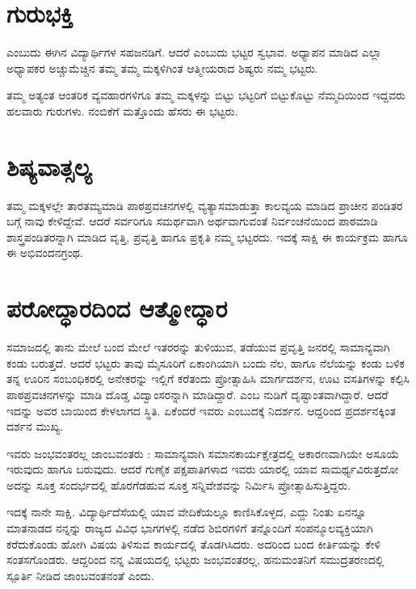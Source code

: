 {\section*{ಗುರುಭಕ್ತಿ}  
\vskip -4pt

   ಎಂಬುದು ಈಗಿನ ವಿದ್ಯಾರ್ಥಿಗಳ ಸಹಜನಡಿಗೆ.  ಆದರೆ   ಎಂಬುದು ಭಟ್ಟರ ಸ್ವಭಾವ.  ಅಧ್ಯಾಪನ ಮಾಡಿದ ಎಲ್ಲಾ ಅಧ್ಯಾಪಕರ ಅಚ್ಚುಮೆಚ್ಚಿನ ತಮ್ಮ ತಮ್ಮ ಮಕ್ಕಳಿಗಿಂತ ಆತ್ಮೀಯರಾದ ಶಿಷ್ಯರು ನಮ್ಮ ಭಟ್ಟರು.

ತಮ್ಮ ಅತ್ಯಂತ ಆಂತರಿಕ ವ್ಯವಹಾರಗಳಿಗೂ ತಮ್ಮ ಮಕ್ಕಳನ್ನು ಬಿಟ್ಟು ಭಟ್ಟರಿಗೆ ಬಿಟ್ಟುಕೊಟ್ಟು ನೆಮ್ಮದಿಯಿಂದ ಇದ್ದವರು ಹಲವಾರು ಗುರುಗಳು. ನಂಬಿಕೆಗೆ ಮತ್ತೊಂದು ಹೆಸರು ಈ ಭಟ್ಟರು.
\vskip -10pt

\section*{ಶಿಷ್ಯವಾತ್ಸಲ್ಯ} 
\vskip -2pt

ತಮ್ಮ ಮಕ್ಕಳಲ್ಲೇ ತಾರತಮ್ಯಮಾಡಿ ಪಾಠಪ್ರವಚನಗಳಲ್ಲಿ ವ್ಯತ್ಯಾಸಮಾಡುತ್ತಾ ಕಾಲವ್ಯಯ ಮಾಡಿದ ಪ್ರಾಚೀನ ಪಂಡಿತರ ಬಗ್ಗೆ ನಾವು ಕೇಳಿದ್ದೇವೆ.  ಆದರೆ ಸರ್ವರಿಗೂ ಸಮರ್ಥ\-ವಾಗಿ ಅರ್ಥವಾಗುವಂತೆ ನಿರ್ವಂಚನೆಯಿಂದ ಪಾಠಮಾಡಿ ಶಾಸ್ತ್ರಪಂಡಿತ\-ರನ್ನಾಗಿ ಮಾಡಿದ ವೃತ್ತಿ, ಪ್ರವೃತ್ತಿ ಹಾಗೂ ಪ್ರಕೃತಿ ನಮ್ಮ ಭಟ್ಟರದು.  ಇದಕ್ಕೆ ಸಾಕ್ಷಿ ಈ ಕಾರ್ಯಕ್ರಮ ಹಾಗೂ ಈ ಅಭಿವಂದನಗ್ರಂಥ.
\vskip -10pt

\section*{ಪರೋದ್ಧಾರದಿಂದ ಆತ್ಮೋದ್ಧಾರ} 
\vskip -2pt

ಸಮಾಜದಲ್ಲಿ ತಾನು ಮೇಲೆ ಬಂದ ಮೇಲೆ ಇತರರನ್ನು ತುಳಿಯುವ, ತಡೆಯುವ ಪ್ರವೃತ್ತಿ ಜನರಲ್ಲಿ ಸಾಮಾನ್ಯವಾಗಿ ಕಂಡು ಬರುತ್ತದೆ.  ಆದರೆ ಭಟ್ಟರು ತಾವು ಮೈಸೂರಿಗೆ ಏಕಾಂಗಿಯಾಗಿ ಬಂದು ನೆಲ, ಹಾಗೂ ನೆಲೆಯನ್ನು ಕಂಡು ಬಳಿಕ ತನ್ನ ಊರಿನ  ಸಂಬಂಧಿಕರಲ್ಲಿ ಅನೇಕರನ್ನು ಇಲ್ಲಿಗೆ ಕರೆತಂದು ಪ್ರೋತ್ಸಾಹಿಸಿ ಮಾರ್ಗದರ್ಶನ, ಊಟ ವಸತಿ\-ಗಳನ್ನು ಕಲ್ಪಿಸಿ ಪಾಠಪ್ರವಚನಗಳನ್ನು ಮಾಡಿ ದೊಡ್ಡ ವಿದ್ವಾಂಸರನ್ನಾಗಿ ಮಾಡಿದ್ದಾರೆ.\break {} ಎಂಬ ನುಡಿಗೆ ದೃಷ್ಟಾಂತವಾಗಿದ್ದಾರೆ.  ಆದರೆ ಇದನ್ನು ಅವರ ಬಾಯಿಂದ ಕೇಳಲಾಗದ ಸ್ಥಿತಿ.  ಏಕೆಂದರೆ ಇವರು   ಎಂಬುದಕ್ಕೆ ನಿದರ್ಶನ. ಆದ್ದರಿಂದ ಪ್ರದರ್ಶನಕ್ಕಿಂತ ದರ್ಶನ ಮುಖ್ಯ. 

ಇವರು ಜಂಭವಂತರಲ್ಲ ಜಾಂಬವಂತರು :  \enginline{-}    ಸಾಮಾನ್ಯವಾಗಿ ಸಮಾನಕಾರ್ಯಕ್ಷೇತ್ರದಲ್ಲಿ ಅಕಾರಣವಾಗಿಯೇ ಅಸೂಯೆ ಇರುವುದು ಹಾಗೂ ಬರುವುದು.  ಆದರೆ ಗುಣೈಕ ಪಕ್ಷಪಾತಿಗಳಾದ ಇವರು ಯಾರಲ್ಲಿ ಯಾವ ಸಾಮರ್ಥ್ಯವಿರುತ್ತದೋ ಅದನ್ನು ಸೂಕ್ತ ಸಂದರ್ಭದಲ್ಲಿ ಹೊರಗೆಡಹುವ  ಸೂಕ್ತ ಸನ್ನಿವೇಶವನ್ನು ನಿರ್ಮಿಸಿ ಪ್ರೋತ್ಸಾಹಿಸು\-ತ್ತಿದ್ದರು. 

ಇದಕ್ಕೆ ನಾನೇ ಸಾಕ್ಷಿ.  ವಿದ್ಯಾರ್ಥಿದೆಸೆಯಲ್ಲಿ ಯಾವ ವೇದಿಕೆಯಲ್ಲೂ ಕಾಣಿಸಿಕೊಳ್ಳದ, ಎದ್ದು ನಿಂತು ಏನನ್ನೂ ಮಾತನಾಡದ ನನ್ನನ್ನು ರಾಜ್ಯದ ವಿವಿಧ ಭಾಗಗಳಲ್ಲಿ ನಡೆದ ಶಿಬಿರ\-ಗಳಿಗೆ ತನ್ನೊಂದಿಗೆ ಸಂಪನ್ಮೂಲವ್ಯಕ್ತಿಯಾಗಿ ಕರೆದುಕೊಂಡು ಹೋಗಿ ವಿಷಯ ತಿಳಿಸುವ ಕಾರ್ಯದಲ್ಲಿ ತೊಡಗಿಸಿದರು.  ಅದರಿಂದ ಬಂದ ಕೀರ್ತಿಯನ್ನು ಕೇಳಿ ಸಂತಸಗೊಂಡರು.  ಆದ್ದರಿಂದ ನನ್ನ ವಿಷಯದಲ್ಲಿ ಭಟ್ಟರು ಜಂಭವಂತರಲ್ಲ,  ಹನುಮಂತನಿಗೆ  ಸಮುದ್ರತರಣ\-ದಲ್ಲಿ  ಸ್ಪೂರ್ತಿ ನೀಡಿದ  ಜಾಂಬವಂತನಂತೆ ಎಂದು.

}
